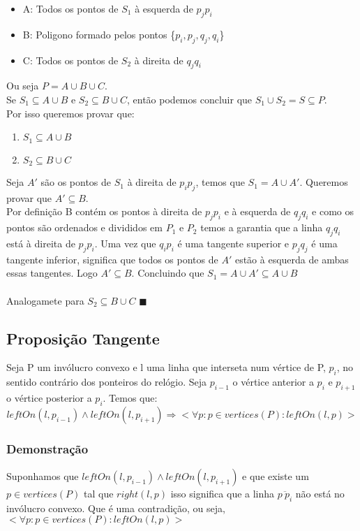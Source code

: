 \documentclass[11pt]{article}
\begin{document}
\begin{itemize}
    \item A: Todos os pontos de $S_1$ à esquerda de $p_jp_i$
    \item B: Poligono formado pelos pontos \{$p_i,p_j,q_j,q_i$\}
    \item C: Todos os pontos de $S_2$ à direita de $q_jq_i$
\end{itemize}
Ou seja $P = A \cup B \cup C$.\\
Se $S_1 \subseteq A \cup B$ e $S_2 \subseteq B \cup C$,
então podemos concluir que $S_1 \cup S_2 = S \subseteq P$.\\
Por isso queremos provar que:
\begin{enumerate}
    \item $S_1 \subseteq A \cup B$
    \item $S_2 \subseteq B \cup C$
\end{enumerate}
Seja $A'$ são os pontos de $S_1$ à direita de $p_ip_j$,
temos que $S_1 = A \cup A'$. 
\newline
Queremos provar que $A' \subseteq B$.\\
Por definição B contém os pontos à direita de $p_jp_i$ e à esquerda
de $q_jq_i$ e como os pontos são ordenados e divididos em $P_1$ e $P_2$
temos a garantia que a linha $q_jq_i$ está à direita de $p_jp_i$.
Uma vez que $q_ip_i$ é uma tangente superior e $p_jq_j$ é uma tangente
inferior, significa que todos os pontos de $A'$ estão à esquerda de
ambas essas tangentes. Logo $A' \subseteq B$.
Concluindo que $S_1 = A \cup A' \subseteq A \cup B$\\ \\
Analogamete para $S_2 \subseteq B \cup C$
\hfill $\blacksquare$

\subsection{Proposição Tangente}
Seja 
    P um invólucro convexo e 
    l uma linha que interseta num vértice de P, $p_i$,
no sentido contrário dos ponteiros do relógio.
Seja $p_{i-1}$ o vértice anterior a $p_i$ e $p_{i+1}$ o vértice posterior a $p_i$.
Temos que:
$$leftOn(l, p_{i-1}) \wedge leftOn(l, p_{i+1}) \Rightarrow
    <\forall p : p \in vertices(P) : leftOn(l, p)>$$

\subsubsection{Demonstração}
Suponhamos que $leftOn(l, p_{i-1}) \wedge leftOn(l, p_{i+1})$ 
e que existe um $p \in vertices(P)$ tal que $right(l, p)$
isso significa que a linha $\overline{p\ p_i}$ não está no invólucro convexo.
Que é uma contradição, ou seja, $<\forall p : p \in vertices(P) : leftOn(l, p)>$
\end{document}
